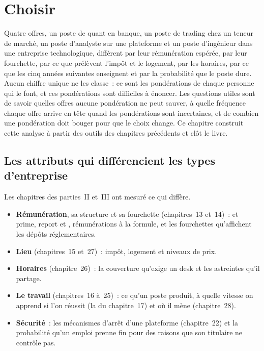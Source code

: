 \chapter{Choisir}\label{ch:in:choosing}

Quatre offres, un poste de quant en banque, un poste de trading chez un teneur de marché, un poste d'analyste sur une plateforme et un poste d'ingénieur
dans une entreprise technologique, diffèrent par leur rémunération espérée, par leur fourchette, par ce que prélèvent l'impôt et le logement, par les horaires, par ce que les cinq
années suivantes enseignent et par la probabilité que le poste dure. Aucun chiffre unique ne les classe~: ce sont les pondérations de chaque personne qui le font, et ces pondérations sont
difficiles à énoncer. Les questions utiles sont de savoir quelles offres aucune pondération ne peut sauver, à quelle fréquence chaque offre arrive en tête quand les pondérations sont incertaines,
et de combien une pondération doit bouger pour que le choix change. Ce chapitre construit cette analyse
à partir des outils des chapitres précédents et clôt le livre.

\section{Les attributs qui différencient les types d'entreprise}

Les chapitres des parties~II et~III ont mesuré ce qui diffère.
\begin{itemize}
\item \textbf{Rémunération}, sa structure et sa fourchette (chapitres~13 et~14)~:  et prime, report et ,
rémunérations à la formule, et les fourchettes qu'affichent les dépôts réglementaires.
\item \textbf{Lieu} (chapitres~15 et~27)~: impôt, logement et niveaux de prix.
\item \textbf{Horaires} (chapitre~26)~: la couverture qu'exige un desk et les astreintes qu'il partage.
\item \textbf{Le travail} (chapitres~16 à~25)~: ce qu'un poste produit, à quelle vitesse on apprend si l'on réussit (la  du chapitre~17) et
où il mène (chapitre~28).
\item \textbf{Sécurité}~: les mécanismes d'arrêt d'une plateforme (chapitre~22) et la probabilité
qu'un emploi prenne fin pour des raisons que son titulaire ne contrôle pas.
\end{itemize}

